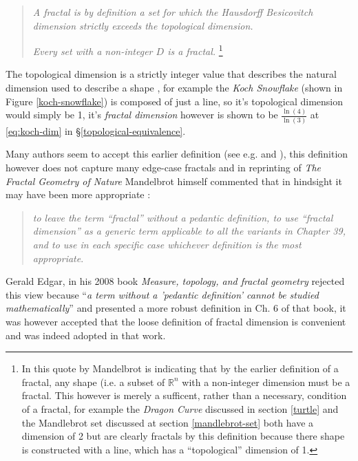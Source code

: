 \documentclass[a4paper,11pt,twoside]{article}
\begin{document}
\begin{quote}
\emph{A fractal is by definition a set for which the Hausdorff Besicovitch dimension
strictly exceeds the topological dimension.}

\emph{Every set with a non-integer \(D\) is a fractal.} \footnote{In this quote by Mandelbrot is indicating that by the earlier definition of a
fractal, any shape (i.e. a subset of \(\mathbb{R}^{n}\) with a non-integer
dimension must be a fractal. This however is merely a sufficent, rather than a
necessary, condition of a fractal, for example the \emph{Dragon Curve} discussed in
section \ref{turtle} and the Mandlebrot set discussed at section \ref{mandlebrot-set} both
have a dimension of 2 but are clearly fractals by this definition because there
shape is constructed with a line, which has a ``topological'' dimension of 1.}
\end{quote}

The topological dimension is a strictly integer value that describes the natural dimension used to describe a shape \cite{sandersonFractalsAreTypically2017},
for example the \emph{Koch Snowflake} (shown in Figure \ref{koch-snowflake}) is composed of
just a line, so it's topological dimension would simply be 1, it's \emph{fractal
dimension} however is shown to be \(\frac{\ln\left( 4 \right)}{\ln\left( 3
\right)}\) at \eqref{eq:koch-dim} in \S\ref{topological-equivalence}.

Many authors seem to accept this earlier definition (see e.g. \cite[\S2.2]{vicsekFractalGrowthPhenomena1992} and \cite[\S2.1]{telChaoticDynamicsIntroduction2006}),
this definition however does not capture many edge-case fractals
 \cite[VII]{edgarMeasureTopologyFractal2008a} and in reprinting of \emph{The
Fractal Geometry of Nature} Mandelbrot himself commented that in hindsight it
may have been more appropriate \cite[p. 459]{mandelbrotFractalGeometryNature1982}:

\begin{quote}
\emph{to leave the term ``fractal” without a pedantic definition, to use “fractal dimension” as a generic term applicable to all the variants in Chapter 39, and to use in each specific case whichever definition is the most appropriate}.
\end{quote}

Gerald Edgar, in his 2008 book \emph{Measure, topology, and fractal geometry}
rejected this view because ``\emph{a term without a 'pedantic definition' cannot be
studied mathematically}'' \cite[VII]{edgarMeasureTopologyFractal2008a} and
presented a more robust definition in Ch. 6 of that book, it was however
accepted that the loose definition of fractal dimension is convenient and was
indeed adopted in that work.
\end{document}
